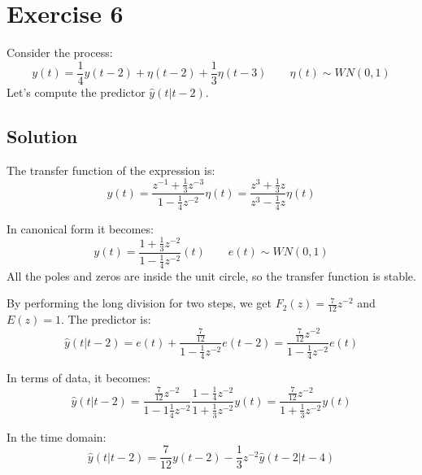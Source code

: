 \section{Exercise 6}

Consider the process: 
\[y(t)=\dfrac{1}{4}y(t-2)+\eta(t-2)+\dfrac{1}{3}\eta(t-3)\qquad \eta(t)\sim WN(0,1)\]
Let's compute the predictor $\hat{y}(t|t-2)$. 

\subsection*{Solution}
The transfer function of the expression is:
\[y(t)=\dfrac{z^{-1}+\frac{1}{3}z^{-3}}{1-\frac{1}{4}z^{-2}}\eta(t)=\dfrac{z^3+\frac{1}{3}z}{z^3-\frac{1}{4}z}\eta(t)\]

In canonical form it becomes: 
\[y(t)=\dfrac{1+\frac{1}{3}z^{-2}}{1-\frac{1}{4}z^{-2}}(t)\qquad e(t)\sim WN(0,1)\]
All the poles and zeros are inside the unit circle, so the transfer function is stable.

By performing the long division for two steps, we get $F_2(z)=\frac{7}{12}z^{-2}$ and $E(z)=1$. 
The predictor is: 
\[\hat{y}(t|t-2)=e(t)+\dfrac{\frac{7}{12}}{1-\frac{1}{4}z^{-2}}e(t-2)=\dfrac{\frac{7}{12}z^{-2}}{1-\frac{1}{4}z^{-2}}e(t)\]

In terms of data, it becomes:
\[\hat{y}(t|t-2)=\dfrac{\frac{7}{12}z^{-2}}{1-1\frac{1}{4}z^{-2}}\dfrac{1-\frac{1}{4}z^{-2}}{1+\frac{1}{3}z^{-2}}y(t)=\dfrac{\frac{7}{12}z^{-2}}{1+\frac{1}{3}z^{-2}}y(t)\]

In the time domain:
\[\hat{y}(t|t-2)=\frac{7}{12}y(t-2)-\frac{1}{3}z^{-2}\hat{y}(t-2|t-4)\]